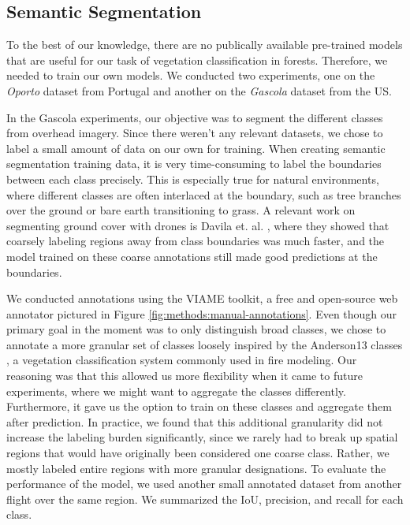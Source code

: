 \subsection{Semantic Segmentation} \label{sec:semseg}
To the best of our knowledge, there are no publically available pre-trained models that are useful for our task of vegetation classification in forests. Therefore, we needed to train our own models. We conducted two experiments, one on the \textit{Oporto} dataset from Portugal and another on the \textit{Gascola} dataset from the US. 

In the Gascola experiments, our objective was to segment the different classes from overhead imagery. Since there weren't any relevant datasets, we chose to label a small amount of data on our own for training. When creating semantic segmentation training data, it is very time-consuming to label the boundaries between each class precisely. This is especially true for natural environments, where different classes are often interlaced at the boundary, such as tree branches over the ground or bare earth transitioning to grass. A relevant work on segmenting ground cover with drones is Davila et. al. \cite{Davila2022ADAPT:AI}, where they showed that coarsely labeling regions away from class boundaries was much faster, and the model trained on these coarse annotations still made good predictions at the boundaries.

We conducted annotations using the VIAME toolkit, a free and open-source web annotator pictured in Figure \ref{fig:methods:manual-annotations}. Even though our primary goal in the moment was to only distinguish broad classes, we chose to annotate a more granular set of classes loosely inspired by the Anderson13 classes \cite{anderson1981aids}, a vegetation classification system commonly used in fire modeling. Our reasoning was that this allowed us more flexibility when it came to future experiments, where we might want to aggregate the classes differently. Furthermore, it gave us the option to train on these classes and aggregate them after prediction. In practice, we found that this additional granularity did not increase the labeling burden significantly, since we rarely had to break up spatial regions that would have originally been considered one coarse class. Rather, we mostly labeled entire regions with more granular designations. 
To evaluate the performance of the model, we used another small annotated dataset from another flight over the same region. We summarized the IoU, precision, and recall for each class.


